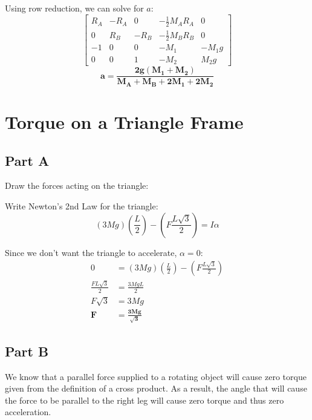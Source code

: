 \documentclass{article}
\begin{document}
Using row reduction, we can solve for $a$:
$$\left[
    \begin{array}{ccccc}
        R_{A} & -R_{A} & 0 & -\frac{1}{2}M_A R_A & 0\\
        0 & R_{B} & -R_{B} & -\frac{1}{2}M_B R_B & 0 \\
        -1 & 0 & 0 & -M_{1} & -M_{1}g\\
        0 & 0 & 1 & -M_{2} & M_{2}g
    \end{array}
\right]$$
$$\bm{a=\frac{2g(M_1+M_2)}{M_A+M_B+2M_1+2M_2}}$$

\section{Torque on a Triangle Frame}

\subsection*{Part A}

Draw the forces acting on the triangle:
\begin{figure}[H]
    \centering
\end{figure}

Write Newton's 2nd Law for the triangle:
$$(3Mg)\left(\frac{L}{2}\right)-\left(F\frac{L\sqrt{3}}{2}\right)=I\alpha$$

Since we don't want the triangle to accelerate, $\alpha=0$:
\begin{align*}
    0&=(3Mg)\left(\frac{L}{2}\right)-\left(F\frac{L\sqrt{3}}{2}\right)\\
    \frac{FL\sqrt{3}}{2}&=\frac{3MgL}{2}\\
    F\sqrt{3}&=3Mg\\
    \bm{F}&\bm{=\frac{3Mg}{\sqrt{3}}}
\end{align*}

\subsection*{Part B}

We know that a parallel force supplied to a rotating object will cause zero
torque given from the definition of a cross product. As a result, the angle that
will cause the force to be parallel to the right leg will cause zero torque and
thus zero acceleration. 
\end{document}
